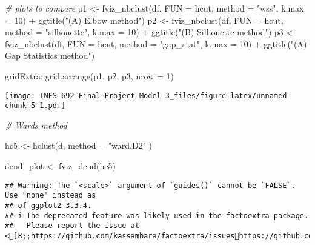 \documentclass[
]{article}
\newenvironment{Shaded}{\begin{snugshade}}{\end{snugshade}}
\newcommand{\AttributeTok}[1]{\textcolor[rgb]{0.77,0.63,0.00}{#1}}
\newcommand{\CommentTok}[1]{\textcolor[rgb]{0.56,0.35,0.01}{\textit{#1}}}
\newcommand{\DecValTok}[1]{\textcolor[rgb]{0.00,0.00,0.81}{#1}}
\newcommand{\FunctionTok}[1]{\textcolor[rgb]{0.00,0.00,0.00}{#1}}
\newcommand{\NormalTok}[1]{#1}
\newcommand{\OtherTok}[1]{\textcolor[rgb]{0.56,0.35,0.01}{#1}}
\newcommand{\SpecialCharTok}[1]{\textcolor[rgb]{0.00,0.00,0.00}{#1}}
\newcommand{\StringTok}[1]{\textcolor[rgb]{0.31,0.60,0.02}{#1}}
\begin{document}
\begin{Shaded}
\begin{Highlighting}[]
\CommentTok{\# plots to compare}
\NormalTok{p1 }\OtherTok{\textless{}{-}} \FunctionTok{fviz\_nbclust}\NormalTok{(df, }\AttributeTok{FUN =}\NormalTok{ hcut, }\AttributeTok{method =} \StringTok{"wss"}\NormalTok{,}
                   \AttributeTok{k.max =} \DecValTok{10}\NormalTok{) }\SpecialCharTok{+}
  \FunctionTok{ggtitle}\NormalTok{(}\StringTok{"(A) Elbow method"}\NormalTok{)}
\NormalTok{p2 }\OtherTok{\textless{}{-}} \FunctionTok{fviz\_nbclust}\NormalTok{(df, }\AttributeTok{FUN =}\NormalTok{ hcut, }\AttributeTok{method =} \StringTok{"silhouette"}\NormalTok{,}
                   \AttributeTok{k.max =} \DecValTok{10}\NormalTok{) }\SpecialCharTok{+}
  \FunctionTok{ggtitle}\NormalTok{(}\StringTok{"(B) Silhouette method"}\NormalTok{)}
\NormalTok{p3 }\OtherTok{\textless{}{-}} \FunctionTok{fviz\_nbclust}\NormalTok{(df, }\AttributeTok{FUN =}\NormalTok{ hcut, }\AttributeTok{method =} \StringTok{"gap\_stat"}\NormalTok{,}
                   \AttributeTok{k.max =} \DecValTok{10}\NormalTok{) }\SpecialCharTok{+}
  \FunctionTok{ggtitle}\NormalTok{(}\StringTok{"(A) Gap Statistics method"}\NormalTok{)}

\NormalTok{gridExtra}\SpecialCharTok{::}\FunctionTok{grid.arrange}\NormalTok{(p1, p2, p3, }\AttributeTok{nrow =} \DecValTok{1}\NormalTok{)}
\end{Highlighting}
\end{Shaded}

\texttt{[image: INFS-692---Final-Project-Model-3\_files/figure-latex/unnamed-chunk-5-1.pdf]}

\begin{Shaded}
\begin{Highlighting}[]
\CommentTok{\# Ward\textquotesingle{}s method}

\NormalTok{hc5 }\OtherTok{\textless{}{-}} \FunctionTok{hclust}\NormalTok{(d, }\AttributeTok{method =} \StringTok{"ward.D2"}\NormalTok{ )}

\NormalTok{dend\_plot }\OtherTok{\textless{}{-}} \FunctionTok{fviz\_dend}\NormalTok{(hc5)}
\end{Highlighting}
\end{Shaded}

\begin{verbatim}
## Warning: The `<scale>` argument of `guides()` cannot be `FALSE`. Use "none" instead as
## of ggplot2 3.3.4.
## i The deprecated feature was likely used in the factoextra package.
##   Please report the issue at <]8;;https://github.com/kassambara/factoextra/issueshttps://github.com/kassambara/factoextra/issues]8;;>.
\end{verbatim}
\end{document}
